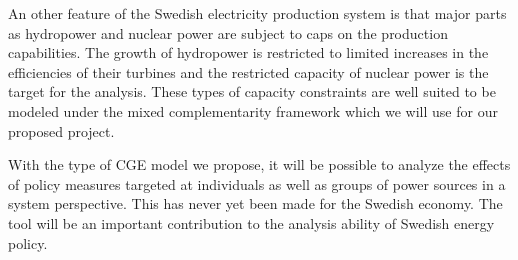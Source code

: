 \documentclass[10pt,a4paper]{article}
\begin{document}
An other feature of the Swedish electricity production system is that major parts as hydropower and nuclear power are subject to caps on the production capabilities. The growth of hydropower is restricted to limited increases in the efficiencies of their turbines and the restricted capacity of nuclear power is the target for the analysis. These types of capacity constraints are well suited to be modeled under the mixed complementarity framework \citep{raey} which we will use for our proposed project.

With the type of CGE model we propose, it will be possible to analyze the effects of policy measures targeted at individuals as well as groups of power sources in a system perspective. This has never yet been made for the Swedish economy. The tool will be an important contribution to the analysis ability of Swedish energy policy.
\end{document}
